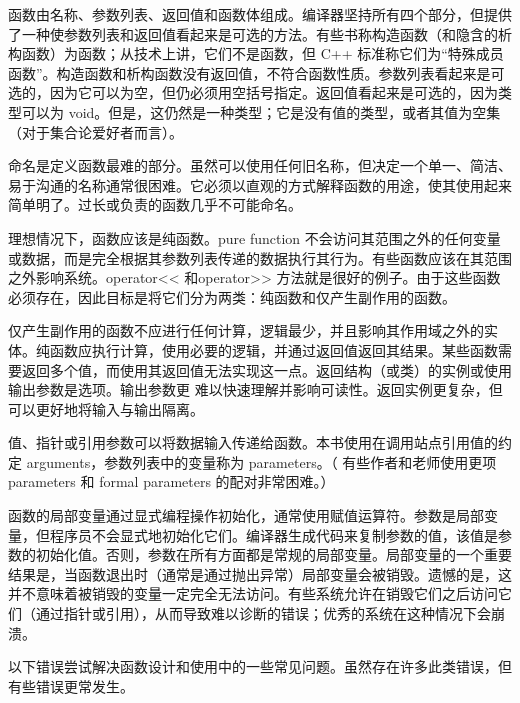 函数由名称、参数列表、返回值和函数体组成。编译器坚持所有四个部分，但提供了一种使参数列表和返回值看起来是可选的方法。有些书称构造函数（和隐含的析构函数）为函数；从技术上讲，它们不是函数，但 C++ 标准称它们为“特殊成员函数”。构造函数和析构函数没有返回值，不符合函数性质。参数列表看起来是可选的，因为它可以为空，但仍必须用空括号指定。返回值看起来是可选的，因为类型可以为 void。但是，这仍然是一种类型；它是没有值的类型，或者其值为空集（对于集合论爱好者而言）。

命名是定义函数最难的部分。虽然可以使用任何旧名称，但决定一个单一、简洁、易于沟通的名称通常很困难。它必须以直观的方式解释函数的用途，使其使用起来简单明了。过长或负责的函数几乎不可能命名。

理想情况下，函数应该是纯函数。pure function 不会访问其范围之外的任何变量或数据，而是完全根据其参数列表传递的数据执行其行为。有些函数应该在其范围之外影响系统。operator<{}< 和operator>{}> 方法就是很好的例子。由于这些函数必须存在，因此目标是将它们分为两类：纯函数和仅产生副作用的函数。

仅产生副作用的函数不应进行任何计算，逻辑最少，并且影响其作用域之外的实体。纯函数应执行计算，使用必要的逻辑，并通过返回值返回其结果。某些函数需要返回多个值，而使用其返回值无法实现这一点。返回结构（或类）的实例或使用输出参数是选项。输出参数更 难以快速理解并影响可读性。返回实例更复杂，但可以更好地将输入与输出隔离。

值、指针或引用参数可以将数据输入传递给函数。本书使用在调用站点引用值的约定 arguments，参数列表中的变量称为 parameters。（ 有些作者和老师使用更项 parameters 和 formal parameters 的配对非常困难。）

函数的局部变量通过显式编程操作初始化，通常使用赋值运算符。参数是局部变量，但程序员不会显式地初始化它们。编译器生成代码来复制参数的值，该值是参数的初始化值。否则，参数在所有方面都是常规的局部变量。局部变量的一个重要结果是，当函数退出时（通常是通过抛出异常）局部变量会被销毁。遗憾的是，这并不意味着被销毁的变量一定完全无法访问。有些系统允许在销毁它们之后访问它们（通过指针或引用），从而导致难以诊断的错误；优秀的系统在这种情况下会崩溃。

以下错误尝试解决函数设计和使用中的一些常见问题。虽然存在许多此类错误，但有些错误更常发生。
